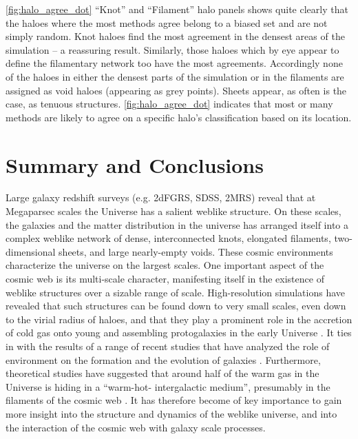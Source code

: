 \autoref{fig:halo_agree_dot} ``Knot'' and ``Filament'' halo panels shows quite clearly that the haloes where the most methods agree belong to a biased set and are not simply random. Knot haloes find the most agreement in the densest areas of the simulation -- a reassuring result. Similarly, those haloes which by eye appear to define the filamentary network too have the most agreements. Accordingly none of the haloes in either the densest parts of the simulation or in the filaments are assigned as void haloes (appearing as grey points). Sheets appear, as often is the case, as tenuous structures. \autoref{fig:halo_agree_dot} indicates that most or many methods are likely to agree on a specific halo's classification based on its location.

\section{Summary and Conclusions}
Large galaxy redshift surveys (e.g. 2dFGRS, SDSS, 2MRS) reveal that at Megaparsec scales
the Universe has a salient weblike structure. On these scales, the galaxies and  the matter distribution in the
universe has arranged itself into a complex weblike network of dense, interconnected knots,
elongated filaments, two-dimensional sheets, and  large nearly-empty voids. These cosmic environments characterize the universe on the largest scales. 
One important aspect of the cosmic web is its multi-scale character, manifesting itself in the existence of weblike
structures over a sizable range of scale. High-resolution simulations have revealed
that such structures can be found down to very small scales, even down to the virial radius
of haloes, and that they play a prominent role in the accretion of cold gas onto young and
assembling protogalaxies in the early Universe \citep{2012MNRAS.422.1732D}. It ties in with the results of a range of recent studies that have analyzed the role of environment on the formation and the evolution of galaxies \citep[e.g.][]{2013ApJ...776...71C,2015MNRAS.448.3665E,2015ApJ...800..112G,2015ApJ...800L...4C,2016MNRAS.455..127M,2017A&A...597A..86P}. Furthermore, theoretical studies have suggested that around half of the warm gas in the Universe is hiding in a ``warm-hot- intergalactic medium'', presumably in the filaments of the cosmic web \citep[e.g.][]{2015Natur.528..105E}. It has therefore become of key importance to gain more insight into the structure and dynamics of the weblike universe, and into the interaction of the cosmic web with galaxy scale processes.


